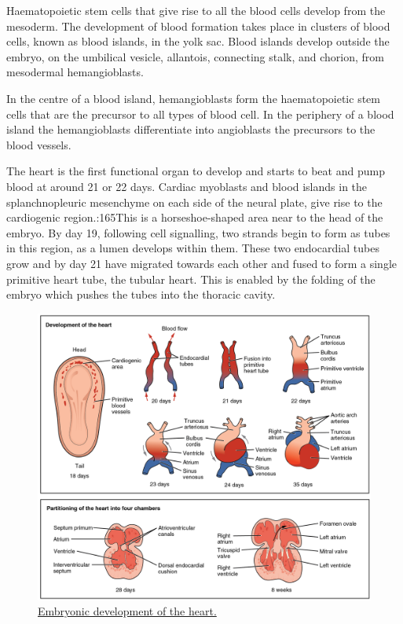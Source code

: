 Haematopoietic stem cells that give rise to all the blood cells develop from the mesoderm. The development of blood formation takes place in clusters of blood cells, known as blood islands, in the yolk sac. Blood islands develop outside the embryo, on the umbilical vesicle, allantois, connecting stalk, and chorion, from mesodermal hemangioblasts.

In the centre of a blood island, hemangioblasts form the haematopoietic stem cells that are the precursor to all types of blood cell. In the periphery of a blood island the hemangioblasts differentiate into angioblasts the precursors to the blood vessels.

The heart is the first functional organ to develop and starts to beat and pump blood at around 21 or 22 days. Cardiac myoblasts and blood islands in the splanchnopleuric mesenchyme on each side of the neural plate, give rise to the cardiogenic region.:165This is a horseshoe-shaped area near to the head of the embryo. By day 19, following cell signalling, two strands begin to form as tubes in this region, as a lumen develops within them. These two endocardial tubes grow and by day 21 have migrated towards each other and fused to form a single primitive heart tube, the tubular heart. This is enabled by the folding of the embryo which pushes the tubes into the thoracic cavity.



\begin{figure}

{\centering \includegraphics[width=0.7\linewidth]{./figures/development/2037_Embryonic_Development_of_Heart} 

}

\caption{\href{https://commons.wikimedia.org/wiki/File:2037_Embryonic_Development_of_Heart.jpg}{Embryonic development of the heart.}}\label{fig:heartdevelopment}
\end{figure}

